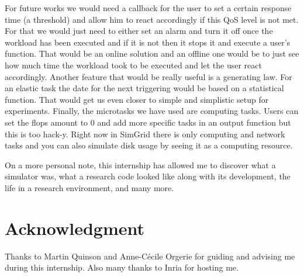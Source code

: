 \documentclass[a4paper, onecolumn, 11pt]{article}
\begin{document}
For future works we would need a callback for the user to set a certain 
response time (a threshold) and allow him to react accordingly if this QoS level
is not met. For that we would just need to either set an alarm and turn it off
once the workload has been executed and if it is not then it stops it and
execute a user's function. That would be an online solution and an offline one
would be to just see how much time the workload took to be executed and let the
user react accordingly. Another feature that would be really useful is a
generating law. For an elastic task the date for the next triggering would be
based on a statistical function. That would get us even closer to simple and
simplistic setup for experiments. Finally, the microtasks we have used are
computing tasks. Users can set the flops amount to 0 and add more specific tasks
in an output function but this is too hack-y. Right now in SimGrid there is only
computing and network tasks and you can also simulate disk usage by seeing it as
a computing resource.

On a more personal note, this internship has allowed me to discover what a 
simulator was, what a research code looked like along with its development, the 
life in a research environment, and many more.


\section*{Acknowledgment}
Thanks to Martin Quinson and Anne-C\'ecile Orgerie for guiding and advising me 
during this internship. Also many thanks to Inria for hosting me.




\end{document}
